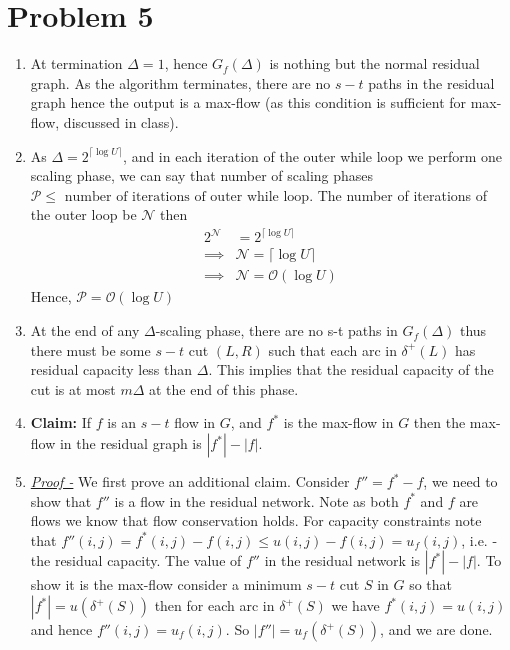 \documentclass{article}
\newcommand{\bigOh}[1]{\mathcal{O}(#1)}
\begin{document}
    \section{Problem 5}
    \begin{enumerate}
        \item At termination $\Delta = 1$, hence $G_f(\Delta)$ is nothing but the normal residual graph. As the algorithm terminates, there are no $s-t$ paths in the residual graph hence the output is a max-flow (as this condition is sufficient for max-flow, discussed in class). 
        \item As $\Delta = 2^{\lceil \log U \rceil}$, and in each iteration of the outer while loop we perform one scaling phase, we can say that number of scaling phases $\mathcal{P} \le \text{ number of iterations of outer while loop.}$ The number of iterations of the outer loop be $\mathcal{N}$ then 
        \begin{equation*}
            \begin{split}
                2^{\mathcal{N}} &= 2^{\lceil \log U \rceil}\\
                \implies & \mathcal{N} = \lceil \log U \rceil\\
                \implies & \mathcal{N} = \bigOh{\log U}
            \end{split}
        \end{equation*}
        Hence, $\mathcal{P} = \bigOh{\log U}$
        \item At the end of any $\Delta$-scaling phase, there are no s-t paths in $G_f(\Delta)$ thus there must be some $s-t$ cut $(L, R)$ such that each arc in $\delta^+(L)$ has residual capacity less than $\Delta$. This implies that the residual capacity of the cut is at most $m\Delta$ at the end of this phase.
        \item \textbf{Claim:} If $f$ is an $s-t$ flow in $G$, and $f^*$ is the max-flow in $G$ then the max-flow in the residual graph is $|f^*|-|f|$. 
        \item[] \textit{\underline{Proof -}} We first prove an additional claim. Consider $f'' = f^* - f$, we need to show that $f''$ is a flow in the residual network. Note as both $f^*$ and $f$ are flows we know that flow conservation holds. For capacity constraints note that $f''(i, j) = f^*(i, j) - f(i, j)\le u(i, j) - f(i, j) = u_f(i, j)$, i.e. - the residual capacity. The value of $f''$ in the residual network is $|f^*|-|f|$. To show it is the max-flow consider a minimum $s-t$ cut $S$ in $G$ so that $|f^*| = u(\delta^+(S))$ then for each arc in $\delta^+(S)$ we have $f^*(i, j) = u(i, j)$ and hence $f''(i, j) = u_f(i, j)$. So $|f''| = u_f(\delta^+(S))$, and we are done. 

\end{enumerate}
\end{document}
